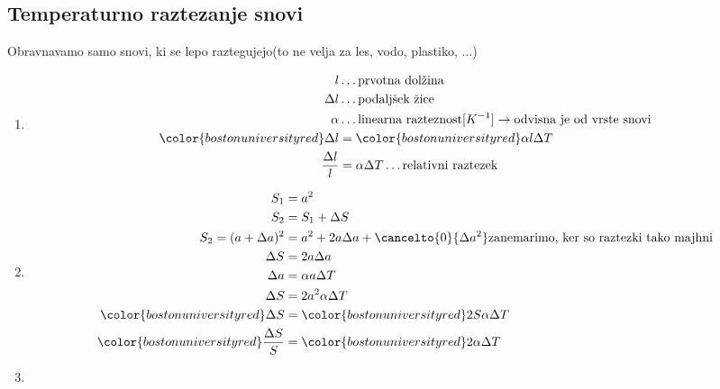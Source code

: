 {\color{indiagreen}\subsection{Temperaturno raztezanje snovi}}
Obravnavamo samo snovi, ki se lepo raztegujejo(to ne velja za les, vodo, plastiko, $\dots$)\\
\begin{enumerate}
	\item 
		\begin{align*}
			l & \dots \text{prvotna dolžina}\\
			\Delta l & \dots \text{podaljšek žice}\\
			\alpha & \dots \text{linearna razteznost} [K^{-1}] \rightarrow \text{odvisna je od vrste snovi}\\
			{\color{bostonuniversityred}\Delta l} &= {\color{bostonuniversityred}\alpha l \Delta T}\\
			\frac{\Delta l}{l} &= \alpha \Delta T \dots \text{relativni raztezek}\\
		\end{align*}
	\item
		\begin{align*}
			S_1 &= a^2\\
			S_2 &= S_1 + \Delta S\\
			S_2 = (a+\Delta a)^2 &= a^2 + 2a\Delta a + \cancelto{0}{\Delta a^2} \text{zanemarimo, ker so raztezki tako majhni}\\
			\Delta S &= 2a\Delta a\\
			\Delta a &= \alpha a \Delta T\\
			\Delta S &= 2a^2\alpha \Delta T\\
			{\color{bostonuniversityred}\Delta S} &= {\color{bostonuniversityred}2S\alpha \Delta T}\\
			{\color{bostonuniversityred}\frac{\Delta S}{S}} &= {\color{bostonuniversityred}2\alpha \Delta T}\\
		\end{align*}
	\item

\end{enumerate}
